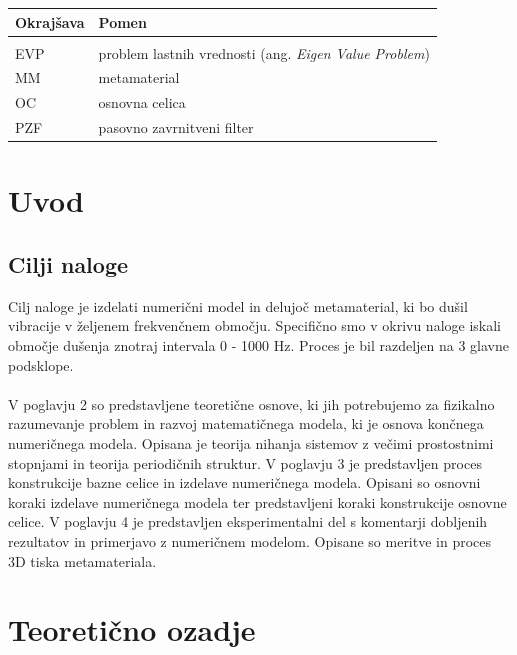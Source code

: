 \documentclass[12pt]{report}
\begin{document}

\begin{longtable}[l]{@{}p{}@{}p{}@{}}
\hline
Okrajšava & Pomen\\
\hline
\endfirsthead
\hline
\endhead
&\\
EVP & problem lastnih vrednosti (ang. \emph{Eigen Value Problem})\\
MM & metamaterial\\
OC & osnovna celica\\
PZF & pasovno zavrnitveni filter\\
\end{longtable}



\chapter{Uvod}
\section{Cilji naloge}

Cilj naloge je izdelati numerični model in delujoč metamaterial, ki bo dušil vibracije
v željenem frekvenčnem območju. Specifično smo v okrivu naloge iskali območje dušenja
znotraj intervala 0 - 1000 Hz. Proces je bil razdeljen na 3 glavne podsklope.
\\
\\
V poglavju 2 so predstavljene teoretične osnove, ki jih potrebujemo za fizikalno razumevanje
problem in razvoj matematičnega modela, ki je osnova končnega numeričnega modela. Opisana je 
teorija nihanja sistemov z večimi prostostnimi stopnjami in teorija periodičnih struktur.
V poglavju 3 je predstavljen proces konstrukcije bazne celice in izdelave numeričnega modela. 
Opisani so osnovni koraki izdelave numeričnega modela ter predstavljeni koraki konstrukcije
osnovne celice.
V poglavju 4 je predstavljen eksperimentalni del s komentarji dobljenih rezultatov in primerjavo
z numeričnem modelom. Opisane so meritve in proces 3D tiska metamateriala.

\chapter{Teoretično ozadje}
\end{document}
